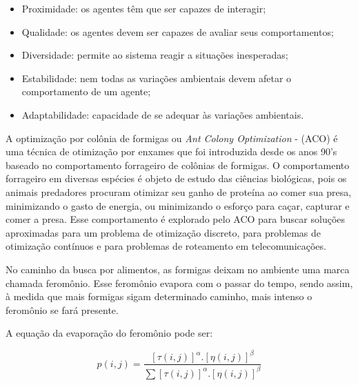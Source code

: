 \begin{itemize}
  \item{Proximidade: os agentes têm que ser capazes de interagir;}
  \item{Qualidade: os agentes devem ser capazes de avaliar seus comportamentos;}
  \item{Diversidade: permite ao sistema reagir a situações inesperadas;} 
  \item{Estabilidade: nem todas as variações ambientais devem afetar o comportamento de um agente;}
  \item{Adaptabilidade: capacidade de se adequar às variações ambientais.}
\end{itemize}


\vspace{0.3cm}

A optimização por colônia de formigas ou \textit{Ant Colony Optimization} - (ACO) é uma técnica de otimização por enxames que foi
introduzida desde os anos 90's \cite{Blum2005} baseado no comportamento forrageiro de colônias de formigas.
O comportamento forrageiro em diversas espécies \cite{Dorigo2005} é objeto de estudo das ciências biológicas, pois os animais predadores 
procuram otimizar seu ganho de proteína ao comer sua presa, minimizando o gasto de energia, ou minimizando o esforço para
caçar, capturar e comer a presa. Esse comportamento é explorado pelo ACO para buscar soluções aproximadas para um
problema de otimização discreto, para problemas de otimização contínuos e para problemas de roteamento em telecomunicações.

No caminho da busca por alimentos, as formigas deixam no ambiente uma marca chamada feromônio.
Esse feromônio evapora com o passar do tempo, sendo assim, à medida que mais formigas sigam determinado caminho, mais intenso o feromônio se fará presente. 

A equação da evaporação do feromônio pode ser:

\begin{equation}
p(i,j)= \frac{[\tau (i,j)]^{\alpha }.[\eta (i,j)]^{\beta}}{\sum [\tau (i,j)]^{\alpha }.[\eta (i,j)]^{\beta}}
\end{equation}

\vspace{0.3cm}

